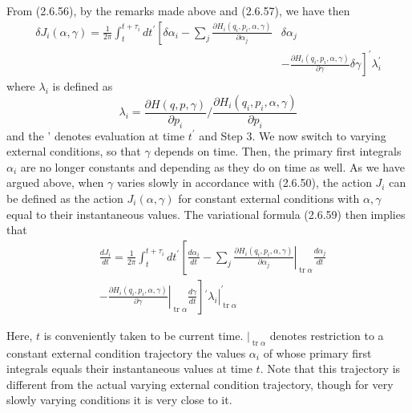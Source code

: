 \documentclass{article}
\begin{document}
From (2.6.56), by the remarks made above and (2.6.57), we have then
$$
\begin{align*}
\delta J_{i}(\alpha, \gamma)=\frac{1}{2 \pi} \int_{t}^{t+\tau_{i}} d t^{\prime}\left[\delta \alpha_{i}-\sum_{j} \frac{\partial H_{i}\left(q_{i}, p_{i}, \alpha, \gamma\right)}{\partial \alpha_{j}}\right. & \delta \alpha_{j}  \tag{2.6.58}\\
& \left.-\frac{\partial H_{i}\left(q_{i}, p_{i}, \alpha, \gamma\right)}{\partial \gamma} \delta \gamma\right]^{\prime} \lambda_{i}^{\prime}
\end{align*}
$$
where $\lambda_{i}$ is defined as
$$
\begin{equation*}
\lambda_{i}=\frac{\partial H(q, p, \gamma)}{\partial p_{i}} / \frac{\partial H_{i}\left(q_{i}, p_{i}, \alpha, \gamma\right)}{\partial p_{i}} \tag{2.6.59}
\end{equation*}
$$
and the ' denotes evaluation at time $t^{\prime}$ and
Step 3. We now switch to varying external conditions, so that $\gamma$ depends on time. Then, the primary first integrals $\alpha_{i}$ are no longer constants and depending as they do on
time as well. As we have argued above, when $\gamma$ varies slowly in accordance with (2.6.50), the action $J_{i}$ can be defined as the action $J_{i}(\alpha, \gamma)$ for constant external conditions with $\alpha, \gamma$ equal to their instantaneous values. The variational formula (2.6.59) then implies that
$$
\begin{align*}
& \frac{d J_{i}}{d t}=\frac{1}{2 \pi} \int_{t}^{t+\tau_{i}} d t^{\prime}\left[\frac{d \alpha_{i}}{d t}-\left.\sum_{j} \frac{\partial H_{i}\left(q_{i}, p_{i}, \alpha, \gamma\right)}{\partial \alpha_{j}}\right|_{\operatorname{tr} \alpha} \frac{d \alpha_{j}}{d t}\right.  \tag{2.6.60}\\
&\left.-\left.\frac{\partial H_{i}\left(q_{i}, p_{i}, \alpha, \gamma\right)}{\partial \gamma}\right|_{\operatorname{tr} \alpha} \frac{d \gamma}{d t}\right]\left.^{\prime} \lambda_{i}\right|_{\operatorname{tr} \alpha} ^{\prime}
\end{align*}
$$

Here, $t$ is conveniently taken to be current time. $\left.\right|_{\operatorname{tr} \alpha}$ denotes restriction to a constant external condition trajectory the values $\alpha_{i}$ of whose primary first integrals equals their instantaneous values at time $t$. Note that this trajectory is different from the actual varying external condition trajectory, though for very slowly varying conditions it is very close to it.
\end{document}
